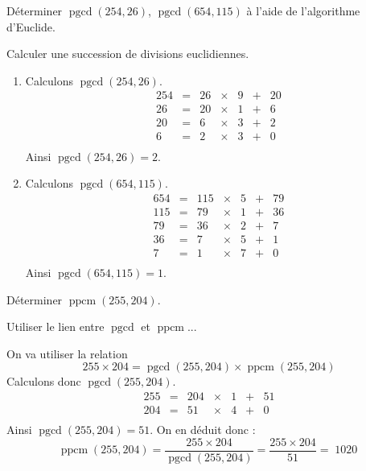 \documentclass[11pt,class=report,crop=false]{standalone}
\newcommand{\pgcd}{\mathop{\mathrm{pgcd}}\nolimits}
\newcommand{\ppcm}{\mathop{\mathrm{ppcm}}\nolimits}
\begin{document}
\exercice{}
\enonce
Déterminer $\pgcd(254, 26)$, $\pgcd(654, 115)$ à l'aide de l'algorithme d'Euclide.
\finenonce

\indication
Calculer une succession de divisions euclidiennes.
\finindication

\correction
\sauteligne
\begin{enumerate}
    \item   
    Calculons $\pgcd(254,26)$.
    $$
    \begin{array}{rclclcl}
    254 & = & 26 & \times & 9 & + & 20 \\
    26 & = & 20  & \times & 1 & + & 6 \\
    20  & = & 6  & \times & 3 & + & \boxed{2} \\
    6  & = & 2  & \times & 3 & + & 0 \\
    \end{array}
    $$
    Ainsi $\pgcd(254,26) = 2$.
    
    
    \item 
    Calculons $\pgcd(654,115)$.
$$
\begin{array}{rclclcl}
654 & = & 115 & \times & 5 & + & 79 \\
115 & = & 79  & \times & 1 & + & 36 \\
79 & = & 36  & \times & 2 & + & 7 \\
36 & = & 7  & \times & 5 & + & \boxed{1}  \\
7  & = & 1  & \times & 7 & + & 0 \\
\end{array}
$$
Ainsi $\pgcd(654,115) = 1$.    
    

\end{enumerate}
\fincorrection
\finexercice



\exercice{}
\enonce
Déterminer $\ppcm(255, 204)$.
\finenonce

\indication
Utiliser le lien entre $\pgcd$ et $\ppcm$...
\finindication

\correction
\sauteligne
On va utiliser la relation
$$ 255 \times 204 = \pgcd(255,204) \times \ppcm(255,204) $$ 
    Calculons donc $\pgcd(255,204)$.
    $$
    \begin{array}{rclclcl}
    255 & = & 204 & \times & 1 & + & \boxed{51} \\
    204 & = & 51  & \times & 4 & + & 0 \\
    \end{array}
    $$
    Ainsi $\pgcd(255,204) = 51$. On en déduit donc :
    $$ \ppcm(255,204) = \frac{255 \times 204}{\pgcd(255,204)} = \frac{255 \times 204}{51} = \boxed{ \; 1020 \;} $$
\fincorrection
\finexercice
\end{document}
